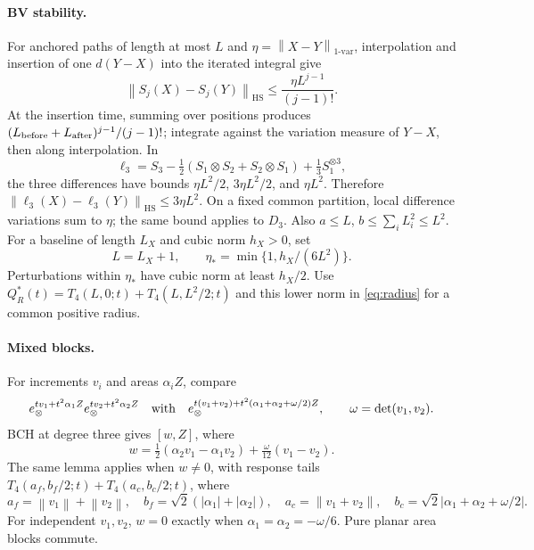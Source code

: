 \documentclass[11pt,a4paper]{article}
\newcommand{\HS}{\mathrm{HS}}
\newcommand{\norm}[1]{\left\lVert#1\right\rVert}
\begin{document}
\paragraph{BV stability.}
For anchored paths of length at most \(L\) and
\(\eta=\norm{X-Y}_{1\text{-var}}\), interpolation and insertion of
one \(d(Y-X)\) into the iterated integral give
\[
 \norm{S_j(X)-S_j(Y)}_{\HS}
 \le\frac{\eta L^{j-1}}{(j-1)!}.
\]
At the insertion time, summing over positions produces
\((L_{\rm before}+L_{\rm after})^{j-1}/(j-1)!\); integrate against the
variation measure of \(Y-X\), then along interpolation.
In
\[
 \ell_3=S_3-\tfrac12(S_1\otimes S_2+S_2\otimes S_1)
              +\tfrac13 S_1^{\otimes3},
\]
the three differences have bounds \(\eta L^2/2\), \(3\eta L^2/2\),
and \(\eta L^2\). Therefore
\(\norm{\ell_3(X)-\ell_3(Y)}_{\HS}\le3\eta L^2\).
On a fixed common partition, local difference variations sum to \(\eta\);
the same bound applies to \(D_3\).
Also \(a\le L\), \(b\le\sum_iL_i^2\le L^2\).
For a baseline of length \(L_X\) and cubic norm \(h_X>0\), set
\[
 L=L_X+1,\qquad \eta_*=\min\{1,h_X/(6L^2)\}.
\]
Perturbations within \(\eta_*\) have cubic norm at least \(h_X/2\).
Use \(Q_R^*(t)=T_4(L,0;t)+T_4(L,L^2/2;t)\) and this lower norm in
\eqref{eq:radius} for a common positive radius.

\paragraph{Mixed blocks.}
For increments \(v_i\) and areas \(\alpha_iZ\), compare
\[
 e_\otimes^{tv_1+t^2\alpha_1Z}e_\otimes^{tv_2+t^2\alpha_2Z}
 \quad\hbox{with}\quad
 e_\otimes^{t(v_1+v_2)+t^2(\alpha_1+\alpha_2+\omega/2)Z},
 \qquad\omega=\det(v_1,v_2).
\]
BCH at degree three gives \([w,Z]\), where
\[
 w=\tfrac12(\alpha_2v_1-\alpha_1v_2)
                  +\tfrac{\omega}{12}(v_1-v_2).
\]
The same lemma applies when \(w\ne0\), with response tails
\(T_4(a_f,b_f/2;t)+T_4(a_c,b_c/2;t)\), where
\[
 a_f=\norm{v_1}+\norm{v_2},\quad b_f=\sqrt2(|\alpha_1|+|\alpha_2|),
 \quad a_c=\norm{v_1+v_2},\quad b_c=\sqrt2|\alpha_1+\alpha_2+\omega/2|.
\]
For independent \(v_1,v_2\), \(w=0\) exactly when
\(\alpha_1=\alpha_2=-\omega/6\). Pure planar area blocks commute.
\end{document}
